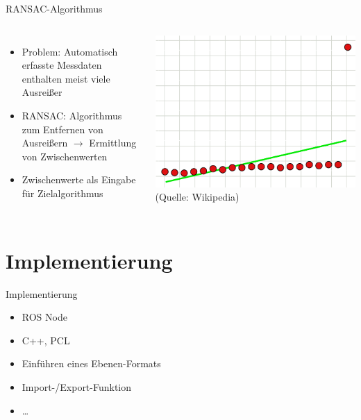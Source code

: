 \documentclass[18pt]{beamer}
\begin{document}
\begin{frame}{RANSAC-Algorithmus}
	\begin{columns}
		\begin{itemize}
			\item Problem: Automatisch erfasste Messdaten enthalten meist viele Ausreißer
			\item RANSAC: Algorithmus zum Entfernen von Ausreißern \(\longrightarrow\) Ermittlung von Zwischenwerten
			\item Zwischenwerte als Eingabe für Zielalgorithmus
		\end{itemize}
		\includegraphics[scale=0.28]{images/ausreisser.pdf}
		(Quelle: Wikipedia)
	\end{columns}
\end{frame}



\section{Implementierung}

\begin{frame}{Implementierung}
	\begin{itemize}
		\item ROS Node
		\item C++, PCL
		\item Einführen eines Ebenen-Formats
		\item Import-/Export-Funktion
		\item \dots
	\end{itemize}
\end{frame}
\end{document}
